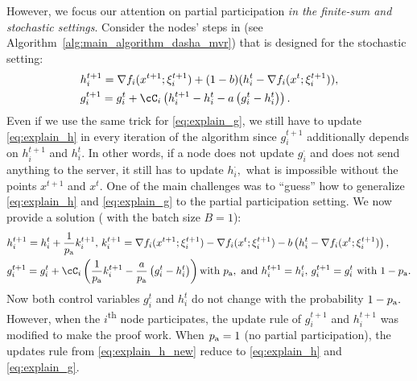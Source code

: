 \documentclass{article}
\newcommand{\algorithmname}{DASHA-PP}
\newcommand*{\probavailable}{\ensuremath{p_{\textnormal{a}}}}
\begin{document}
However, we focus our attention on partial participation \emph{in the finite-sum and stochastic settings}. Consider the nodes' steps in  (see Algorithm~\ref{alg:main_algorithm_dasha_mvr}) that is designed for the stochastic setting:
\begin{align}
  &h^{t+1}_i = \nabla f_i(x^{t+1};\xi^{t+1}_{i}) + (1 - b) (h^t_i - \nabla f_i(x^{t};\xi^{t+1}_{i})), \label{eq:explain_h}\\
  &g^{t+1}_i = g^{t}_i + \cC_i\left(h^{t+1}_i - h^{t}_i - a \left(g^{t}_i - h^{t}_i\right)\right). \label{eq:explain_g}
\end{align}
Even if we use the same trick for \eqref{eq:explain_g}, we still have to update \eqref{eq:explain_h} in every iteration of the algorithm since $g^{t+1}_i$ additionally depends on $h^{t+1}_i$ and $h^{t}_i.$ In other words, if a node does not update $g_i^{\cdot}$ and does not send anything to the server, it still has to update $h^{\cdot}_i,$ what is impossible without the points $x^{t+1}$ and $x^{t}.$
One of the main challenges was to ``guess'' how to generalize \eqref{eq:explain_h} and \eqref{eq:explain_g} to the partial participation setting. We now provide a solution (\algname{\algorithmname-MVR} with the batch size $B = 1$):
\begin{eqnarray}
\begin{aligned}
  & h^{t+1}_i = h^t_i + \frac{1}{\probavailable}k^{t+1}_i, \,k^{t+1}_i = \nabla f_i(x^{t+1};\xi^{t+1}_{i}) - \nabla f_i(x^{t};\xi^{t+1}_{i}) - b \left(h^t_i - \nabla f_i(x^{t};\xi^{t+1}_{i})\right), \label{eq:explain_h_new}\\
  & g^{t+1}_i = g^{t}_i + \cC_i\left(\frac{1}{\probavailable}k^{t+1}_i - \frac{a}{\probavailable} \left(g^{t}_i - h^{t}_i\right)\right) \textnormal{with } \probavailable, \textnormal{ and } h^{t+1}_i = h^{t}_i,\, g^{t+1}_i = g^{t}_i \textnormal{ with } 1 - \probavailable.
\end{aligned}
\end{eqnarray}
Now both control variables $g_i^{t}$ and $h_i^{t}$ do not change with the probability $1 - \probavailable.$ However, when the $i$\textsuperscript{th} node participates, the update rule of $g_i^{t+1}$ and $h_i^{t+1}$ was modified to make the proof work. When $\probavailable = 1$ (no partial participation), the updates rule from \eqref{eq:explain_h_new} reduce to \eqref{eq:explain_h} and \eqref{eq:explain_g}.
\end{document}
